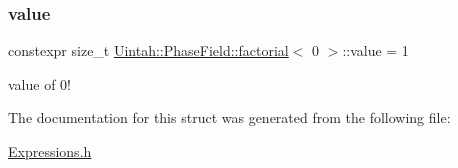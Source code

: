 \subsubsection{\texorpdfstring{value}{value}}
{\footnotesize\ttfamily constexpr size\+\_\+t \hyperlink{structUintah_1_1PhaseField_1_1factorial}{Uintah\+::\+Phase\+Field\+::factorial}$<$ 0 $>$\+::value = 1\hspace{0.3cm}{\ttfamily [static]}}



value of $ 0! $ 



The documentation for this struct was generated from the following file\+:\begin{DoxyCompactItemize}
\item 
\hyperlink{Expressions_8h}{Expressions.\+h}\end{DoxyCompactItemize}
